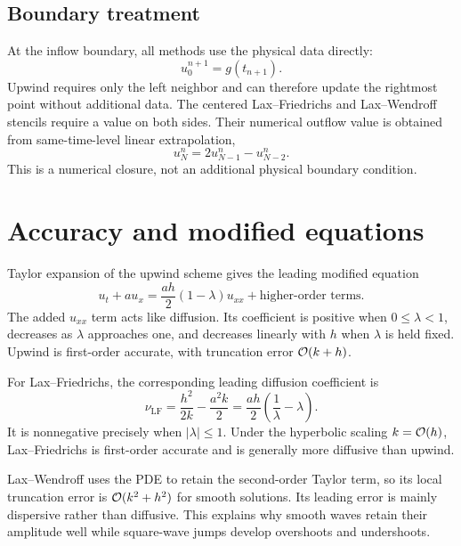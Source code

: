 \subsection{Boundary treatment}

At the inflow boundary, all methods use the physical data directly:
\begin{equation}
 u_0^{n+1}=g(t_{n+1}).
\end{equation}
Upwind requires only the left neighbor and can therefore update the rightmost
point without additional data. The centered Lax--Friedrichs and Lax--Wendroff
stencils require a value on both sides. Their numerical outflow value is
obtained from same-time-level linear extrapolation,
\begin{equation}
 u_N^n=2u_{N-1}^n-u_{N-2}^n.
\end{equation}
This is a numerical closure, not an additional physical boundary condition.

\section{Accuracy and modified equations}

Taylor expansion of the upwind scheme gives the leading modified equation
\begin{equation}
 u_t+a u_x
 =\frac{ah}{2}(1-\lambda)u_{xx}
 +\text{higher-order terms}.
 \label{eq:upwind-modified}
\end{equation}
The added $u_{xx}$ term acts like diffusion. Its coefficient is positive when
$0\leq\lambda<1$, decreases as $\lambda$ approaches one, and decreases
linearly with $h$ when $\lambda$ is held fixed. Upwind is first-order accurate,
with truncation error $\mathcal{O}(k+h)$.

For Lax--Friedrichs, the corresponding leading diffusion coefficient is
\begin{equation}
 \nu_{\mathrm{LF}}
 =\frac{h^2}{2k}-\frac{a^2k}{2}
 =\frac{ah}{2}\left(\frac{1}{\lambda}-\lambda\right).
 \label{eq:lf-diffusion}
\end{equation}
It is nonnegative precisely when $|\lambda|\leq1$. Under the hyperbolic scaling
$k=\mathcal{O}(h)$, Lax--Friedrichs is first-order accurate and is generally more
diffusive than upwind.

Lax--Wendroff uses the PDE to retain the second-order Taylor term, so its local
truncation error is $\mathcal{O}(k^2+h^2)$ for smooth solutions. Its leading error is
mainly dispersive rather than diffusive. This explains why smooth waves retain
their amplitude well while square-wave jumps develop overshoots and
undershoots.

